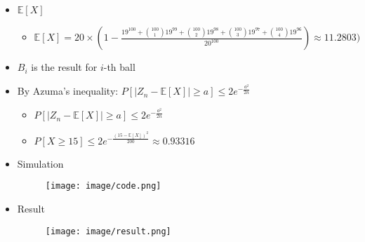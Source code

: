\documentclass[a4paper]{article}
\begin{document}
\section{}
\begin{itemize}
        \begin{figure} [H]
            \texttt{[image: image/12.png]}
        \end{figure}
    \item $\mathbb{E}[X]$
        \begin{itemize}
            \item $\mathbb{E}[X] = 20 \times (1 - \frac{19^{100} + \binom{100}{1}19^{99} + \binom{100}{2}19^{98} + \binom{100}{3}19^{97} + \binom{100}{4}19^{96}}{20^{100}}) \approx 11.2803)$
        \end{itemize}
    \item $B_i$ is the result for $i$-th ball
    \item By Azuma's inequality: $P[|Z_n - \mathbb{E}[X]| \geq a] \leq 2 e^{-\frac{a^2}{2n}}$
        \begin{itemize}
            \item $P[|Z_n - \mathbb{E}[X]| \geq a] \leq 2 e^{-\frac{a^2}{2n}}$
            \item $P[X \geq 15] \leq 2 e^{-\frac{(15-\mathbb{E}[X])^2}{200}} \approx 0.93316$
        \end{itemize}
    \item Simulation
        \begin{figure} [H]
            \texttt{[image: image/code.png]}
        \end{figure}
    \item Result
        \begin{figure} [H]
            \texttt{[image: image/result.png]}
        \end{figure}
\end{itemize}
\end{document}
